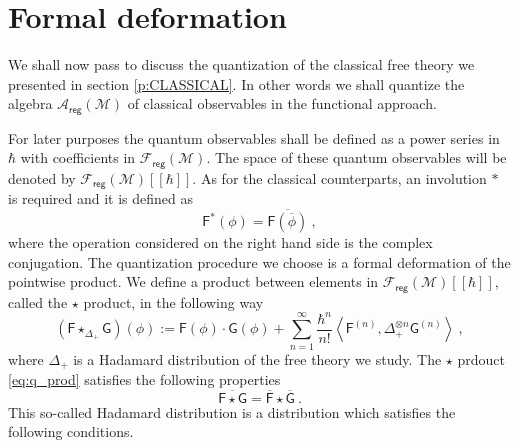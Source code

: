 \documentclass[11pt]{book}
\newcommand{\reg}{\mathsf{reg}}
\newcommand{\sm}[1]{\left\langle#1\right\rangle}
\newcommand{\Acal}{\mathcal{A}}
\newcommand{\Fcal}{\mathcal{F}}
\newcommand{\Mcal}{\mathcal{M}}
\newcommand{\Fsf}{\mathsf{F}}
\newcommand{\Gsf}{\mathsf{G}}
\theoremstyle{break}
\begin{document}
\section{Formal deformation}\label{p:Q_DEFORM}


We shall now pass to discuss the quantization of the classical free theory we presented in section \ref{p:CLASSICAL}. In other words we shall quantize the algebra $\Acal_\reg(\Mcal)$ of classical observables in the functional approach.


For later purposes the quantum observables shall be defined as a power series in $\hbar$ with coefficients in $\Fcal_\reg(\Mcal)$. The space of these quantum observables will be denoted by $\Fcal_\reg(\Mcal)[[\hbar]]$. As for the classical counterparts, an involution $\ast$ is required and it is defined as 
%
\begin{equation*}
\Fsf^\ast(\phi) =  \overline{\Fsf(\overline{\phi})} \ ,
\end{equation*}
%
where the operation considered on the right hand side is the complex conjugation. The quantization procedure we choose is a formal deformation of the pointwise product. We define a product between elements in $\Fcal_\reg(\Mcal)[[\hbar]]$, called the $\star$ product, in the following way
%
\begin{equation}
(\Fsf \star_{\Delta_+} \Gsf)(\phi) := \Fsf(\phi) \cdot \Gsf(\phi) + \sum_{n=1}^\infty \frac{\hbar^n}{n!} \sm{ \Fsf^{(n)} , \Delta_+^{\otimes n} \Gsf^{(n) } } \ ,
\label{eq:q_prod}
\end{equation}
%
where $\Delta_+$ is a Hadamard distribution of the free theory we study. The $\star$ prdouct \eqref{eq:q_prod} satisfies the following properties
%
\begin{equation*}
\overline{\Fsf \star \Gsf} = \overline{\Fsf} \star \overline{\Gsf} \ .
\end{equation*}
%
This so-called Hadamard distribution is a distribution which satisfies the following conditions.
%
\end{document}

